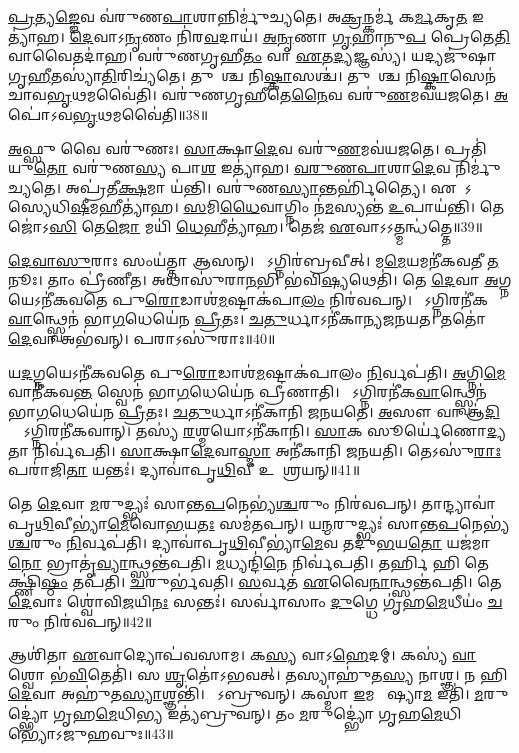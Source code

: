 \ul{𑌪𑍍𑌰}𑌤𑍍𑌯\ul{𑌙𑍍𑌙𑍇}𑌵 𑌵॑𑌰𑍁𑌣\ul{𑌪𑌾}𑌶𑌾𑌨𑍍𑌨𑌿𑌰𑍍𑌮𑍁॑𑌚𑍍𑌯𑌤𑍇।
𑌅\ul{𑌕𑍍𑌰}𑌨𑍍𑌕𑌰𑍍𑌮॑ 𑌕\ul{𑌰𑍍𑌮}𑌕𑍃\ul{𑌤} 𑌇𑌤𑍍𑌯𑌾॑𑌹।
\ul{𑌦𑍇}𑌵𑌾\-𑌽\ul{𑌨𑍃}𑌣𑌂 𑌨𑌿॑𑌰\ul{𑌵}𑌦𑌾𑌯॑।
\ul{𑌅}\ul{𑌨𑍃}𑌣𑌾 \ul{𑌗𑍃}𑌹𑌾𑌨𑍁\ul{𑌪} 𑌪𑍍𑌰𑍇𑌤𑍇\ul{𑌤𑌿} 𑌵𑌾𑌵𑍈𑌤𑌦𑌾॑𑌹।
𑌵𑌰𑍁॑𑌣𑌗𑍃𑌹𑍀\ul{𑌤𑌂} 𑌵𑌾 \ul{𑌏}𑌤\ul{𑌦𑍍𑌯}𑌜𑍍𑌞𑌸𑍍𑌯॑।
𑌯𑌦𑍍𑌯𑌜𑍁॑𑌷𑌾 𑌗𑍃\ul{𑌹𑍀}𑌤𑌸𑍍𑌯𑌾॑\ul{𑌤𑌿}𑌰𑌿𑌚𑍍𑌯॑𑌤𑍇।
𑌤𑍁𑌷𑌾᳚𑌶𑍍𑌚 𑌨𑌿\ul{𑌷𑍍𑌕𑌾}𑌸𑌶𑍍𑌚॑।
𑌤𑍁𑌷𑍈᳚𑌶𑍍𑌚 𑌨𑌿\ul{𑌷𑍍𑌕𑌾}𑌸𑍇𑌨॑ 𑌚𑌾𑌵\ul{𑌭𑍃}𑌥𑌮𑌵𑍈॑𑌤𑌿।
𑌵𑌰𑍁॑𑌣𑌗𑍃𑌹𑍀𑌤𑍇\ul{𑌨𑍈}𑌵 𑌵𑌰𑍁॑\ul{𑌣}𑌮𑌵॑𑌯𑌜𑌤𑍇।
\ul{𑌅}𑌪𑍋॑\-𑌽𑌵\ul{𑌭𑍃}𑌥𑌮𑌵𑍈॑𑌤𑌿॥38॥

\ul{𑌅}𑌫𑍍𑌸𑍁 𑌵𑍈 𑌵𑌰𑍁॑𑌣𑌃।
\ul{𑌸𑌾}𑌕𑍍𑌷𑌾\ul{𑌦𑍇}𑌵 𑌵𑌰𑍁॑\ul{𑌣}𑌮𑌵॑𑌯𑌜𑌤𑍇।
𑌪𑍍𑌰𑌤𑌿॑\-𑌯𑍁\ul{𑌤𑍋} 𑌵𑌰𑍁॑𑌣\ul{𑌸𑍍𑌯} 𑌪𑌾\ul{𑌶} 𑌇𑌤𑍍𑌯𑌾॑𑌹।
\ul{𑌵}\ul{𑌰𑍁}\ul{𑌣}\ul{𑌪𑌾}𑌶𑌾\ul{𑌦𑍇}𑌵 𑌨𑌿𑌰𑍍𑌮𑍁॑𑌚𑍍𑌯𑌤𑍇।
𑌅𑌪𑍍𑌰॑𑌤𑍀\ul{𑌕𑍍𑌷}𑌮𑌾 𑌯॑𑌨𑍍𑌤𑌿।
𑌵𑌰𑍁॑𑌣\ul{𑌸𑍍𑌯𑌾}𑌨𑍍𑌤𑌰𑍍\mbox{}𑌹𑌿॑𑌤𑍍𑌯𑍈।
𑌏𑌧𑍋᳚𑌽𑌸𑍍𑌯𑍇𑌧𑌿\ul{𑌷𑍀}𑌮𑌹𑍀\-𑌤𑍍𑌯𑌾॑𑌹।
\ul{𑌸}𑌮𑌿\ul{𑌧𑍈}𑌵𑌾𑌗𑍍𑌨𑌿𑌂 𑌨॑\ul{𑌮}𑌸𑍍𑌯𑌨𑍍𑌤॑ \ul{𑌉}𑌪𑌾𑌯॑𑌨𑍍𑌤𑌿।
𑌤𑍇𑌜𑍋॑𑌽\ul{𑌸𑌿} 𑌤𑍇\ul{𑌜𑍋} 𑌮𑌯𑌿॑ \ul{𑌧𑍇}𑌹𑍀𑌤𑍍𑌯𑌾॑𑌹।
𑌤𑍇𑌜॑ \ul{𑌏}𑌵𑌾𑌽𑌽𑌤𑍍𑌮𑌨𑍍𑌧॑𑌤𑍍𑌤𑍇॥39॥

\ul{𑌦𑍇}\ul{𑌵𑌾}\ul{𑌸𑍁}𑌰𑌾𑌃 𑌸𑌂𑌯॑𑌤𑍍𑌤𑌾 𑌆𑌸𑌨𑍍।
𑌸𑍋᳚𑌽𑌗𑍍𑌨𑌿𑌰॑𑌬𑍍𑌰𑌵𑍀𑌤𑍍।
𑌮\ul{𑌮𑍇}𑌯𑌮𑌨𑍀॑𑌕\-𑌵𑌤𑍀 \ul{𑌤}𑌨𑍂𑌃।
𑌤𑌾𑌂 𑌪𑍍𑌰𑍀॑𑌣𑍀𑌤।
𑌅𑌥𑌾𑌸𑍁॑𑌰𑌾\ul{𑌨}𑌭𑌿 𑌭॑𑌵𑌿\ul{𑌷𑍍𑌯}𑌥𑍇𑌤𑌿॑।
𑌤𑍇 \ul{𑌦𑍇}𑌵𑌾 \ul{𑌅}𑌗𑍍𑌨𑌯𑍇\-𑌽𑌨𑍀॑𑌕𑌵𑌤𑍇 𑌪𑍁\ul{𑌰𑍋}𑌡𑌾𑌶॑\ul{𑌮}𑌷𑍍𑌟𑌾𑌕॑𑌪𑌾\ul{𑌲𑌂} 𑌨𑌿𑌰॑𑌵𑌪𑌨𑍍।
𑌸𑍋᳚𑌽𑌗𑍍𑌨𑌿𑌰𑌨𑍀॑𑌕\ul{𑌵𑌾}𑌨𑍍𑌥𑍍𑌸𑍍𑌵𑍇𑌨॑ 𑌭𑌾\ul{𑌗}𑌧𑍇𑌯𑍇॑𑌨 \ul{𑌪𑍍𑌰𑍀}𑌤𑌃।
\ul{𑌚}\ul{𑌤𑍁}𑌰𑍍𑌧𑌾\-𑌽𑌨𑍀॑𑌕𑌾𑌨𑍍𑌯\-𑌜𑌨𑌯𑌤।
𑌤𑌤𑍋॑ \ul{𑌦𑍇}𑌵𑌾 𑌅𑌭॑𑌵𑌨𑍍।
𑌪𑌰𑌾𑌽𑌸𑍁॑𑌰𑌾𑌃॥40॥

𑌯\ul{𑌦}𑌗𑍍𑌨𑌯𑍇\-𑌽𑌨𑍀॑𑌕𑌵𑌤𑍇 𑌪𑍁\ul{𑌰𑍋}𑌡𑌾𑌶॑\ul{𑌮}𑌷𑍍𑌟𑌾𑌕॑𑌪𑌾𑌲𑌂 \ul{𑌨𑌿}𑌰𑍍𑌵𑌪॑𑌤𑌿।
\ul{𑌅}𑌗𑍍𑌨𑌿\ul{𑌮𑍇}𑌵𑌾𑌨𑍀॑𑌕𑌵\ul{𑌨𑍍𑌤}\ul{} 𑌸𑍍𑌵𑍇𑌨॑ 𑌭𑌾\ul{𑌗}𑌧𑍇𑌯𑍇॑𑌨 𑌪𑍍𑌰𑍀𑌣𑌾𑌤𑌿।
𑌸𑍋᳚𑌽𑌗𑍍𑌨𑌿𑌰𑌨𑍀॑𑌕\ul{𑌵𑌾}𑌨𑍍𑌥𑍍𑌸𑍍𑌵𑍇𑌨॑ 𑌭𑌾\ul{𑌗}𑌧𑍇𑌯𑍇॑𑌨 \ul{𑌪𑍍𑌰𑍀}𑌤𑌃।
\ul{𑌚}\ul{𑌤𑍁}𑌰𑍍𑌧𑌾\-𑌽𑌨𑍀॑𑌕𑌾𑌨𑌿 𑌜𑌨𑌯𑌤𑍇।
\ul{𑌅}𑌸𑍗 𑌵𑌾 𑌆॑\ul{𑌦𑌿}𑌤𑍍𑌯𑍋᳚\-𑌽𑌗𑍍𑌨𑌿𑌰𑌨𑍀॑𑌕𑌵𑌾𑌨𑍍।
𑌤𑌸𑍍𑌯॑ \ul{𑌰}𑌶𑍍𑌮𑌯𑍋\-𑌽𑌨𑍀॑𑌕𑌾𑌨𑌿।
\ul{𑌸𑌾}𑌕 𑌸𑍂𑌰𑍍𑌯𑍇॑𑌣𑍋\ul{𑌦𑍍𑌯}𑌤𑌾 𑌨𑌿𑌰𑍍𑌵॑𑌪𑌤𑌿।
\ul{𑌸𑌾}𑌕𑍍𑌷𑌾\ul{𑌦𑍇}𑌵𑌾\ul{𑌸𑍍𑌮𑌾} 𑌅𑌨𑍀॑𑌕𑌾𑌨𑌿 𑌜𑌨𑌯𑌤𑌿।
𑌤𑍇𑌽𑌸𑍁॑\ul{𑌰𑌾𑌃} 𑌪𑌰𑌾॑𑌜𑌿\ul{𑌤𑌾} 𑌯𑌨𑍍𑌤𑌃॑।
𑌦𑍍𑌯𑌾𑌵𑌾॑𑌪𑍃\ul{𑌥𑌿}𑌵𑍀 𑌉𑌪𑌾᳚𑌶𑍍𑌰𑌯𑌨𑍍॥41॥

𑌤𑍇 \ul{𑌦𑍇}𑌵𑌾 \ul{𑌮}𑌰𑍁𑌦𑍍𑌭𑍍𑌯𑌃॑ 𑌸𑌾𑌨𑍍𑌤\ul{𑌪}𑌨𑍇𑌭𑍍𑌯॑\ul{𑌶𑍍𑌚}𑌰𑍁𑌂 𑌨𑌿𑌰॑𑌵𑌪𑌨𑍍।
𑌤𑌾𑌨𑍍𑌦𑍍𑌯𑌾𑌵𑌾॑𑌪𑍃\ul{𑌥𑌿}𑌵𑍀\-𑌭𑍍𑌯𑌾॑\ul{𑌮𑍇}𑌵𑍋\ul{𑌭}𑌯\ul{𑌤𑌃} 𑌸𑌮॑𑌤𑌪𑌨𑍍।
𑌯\ul{𑌨𑍍𑌮}𑌰𑍁𑌦𑍍𑌭𑍍𑌯𑌃॑ 𑌸𑌾𑌨𑍍𑌤\ul{𑌪}𑌨𑍇𑌭𑍍𑌯॑\ul{𑌶𑍍𑌚}𑌰𑍁𑌂 \ul{𑌨𑌿}𑌰𑍍𑌵𑌪॑𑌤𑌿।
𑌦𑍍𑌯𑌾𑌵𑌾॑𑌪𑍃\ul{𑌥𑌿}𑌵𑍀𑌭𑍍𑌯𑌾॑\ul{𑌮𑍇}𑌵 𑌤𑌦𑍁॑\ul{𑌭}𑌯\ul{𑌤𑍋} 𑌯𑌜॑𑌮𑌾\ul{𑌨𑍋} 𑌭𑍍𑌰𑌾𑌤𑍃॑\ul{𑌵𑍍𑌯𑌾}𑌨𑍍𑌥𑍍𑌸𑌨𑍍𑌤॑𑌪𑌤𑌿।
\ul{𑌮}𑌧𑍍𑌯𑌨𑍍𑌦𑌿॑\ul{𑌨𑍇} 𑌨𑌿𑌰𑍍𑌵॑𑌪𑌤𑌿।
𑌤𑌰𑍍\mbox{}\ul{𑌹𑌿} 𑌹𑌿 𑌤𑍇𑌕𑍍𑌷𑍍𑌣𑌿॑\ul{𑌷𑍍𑌠𑌂} 𑌤𑌪॑𑌤𑌿।
\ul{𑌚}𑌰𑍁𑌰𑍍𑌭॑𑌵𑌤𑌿।
\ul{𑌸}𑌰𑍍𑌵𑌤॑ \ul{𑌏}𑌵𑍈\ul{𑌨𑌾}𑌨𑍍𑌥𑍍𑌸𑌨𑍍𑌤॑𑌪𑌤𑌿।
𑌤𑍇 \ul{𑌦𑍇}𑌵𑌾𑌃 𑌶𑍍𑌵𑍋॑𑌵𑌿\ul{𑌜}𑌯𑌿\ul{𑌨𑌃} 𑌸𑌨𑍍𑌤𑌃॑।
𑌸𑌰𑍍𑌵𑌾॑𑌸𑌾𑌂 \ul{𑌦𑍁}𑌗𑍍𑌧𑍇 𑌗𑍃॑𑌹\ul{𑌮𑍇}𑌧𑍀𑌯𑌂॑ \ul{𑌚}𑌰𑍁𑌂 𑌨𑌿𑌰॑𑌵𑌪𑌨𑍍॥42॥

𑌆𑌶𑌿॑𑌤𑌾 \ul{𑌏}𑌵𑌾𑌦𑍍𑌯𑍋𑌪॑𑌵𑌸𑌾𑌮।
𑌕\ul{𑌸𑍍𑌯} 𑌵𑌾𑌽\ul{𑌹𑍇}𑌦𑌮𑍍।
𑌕𑌸𑍍𑌯॑ \ul{𑌵𑌾} 𑌶𑍍𑌵𑍋 𑌭॑\ul{𑌵𑌿}𑌤𑍇𑌤𑌿॑।
𑌸 \ul{𑌶𑍃}𑌤𑍋॑\-𑌽𑌭𑌵𑌤𑍍।
𑌤𑌸𑍍𑌯𑌾𑌹𑍁॑𑌤\ul{𑌸𑍍𑌯} 𑌨𑌾𑌶𑍍𑌞\sn{}।
𑌨 𑌹𑌿 \ul{𑌦𑍇}𑌵𑌾 𑌅𑌹𑍁॑𑌤\ul{𑌸𑍍𑌯𑌾}𑌶𑍍𑌞𑌨𑍍𑌤𑌿॑।
𑌤𑍇᳚𑌽𑌬𑍍𑌰𑍁𑌵𑌨𑍍।
𑌕𑌸𑍍𑌮𑌾॑ \ul{𑌇}𑌮 𑌹𑍋᳚𑌷𑍍𑌯𑌾\ul{𑌮} 𑌇𑌤𑌿॑।
\ul{𑌮}𑌰𑍁𑌦𑍍𑌭𑍍𑌯𑍋॑ 𑌗𑍃𑌹\ul{𑌮𑍇}𑌧𑌿\ul{𑌭𑍍𑌯} 𑌇𑌤𑍍𑌯॑𑌬𑍍𑌰𑍁𑌵𑌨𑍍।
𑌤𑌂 \ul{𑌮}𑌰𑍁𑌦𑍍𑌭𑍍𑌯𑍋॑ 𑌗𑍃𑌹\ul{𑌮𑍇}𑌧𑌿𑌭𑍍𑌯𑍋॑\-𑌽𑌜𑍁𑌹𑌵𑍁𑌃॥43॥

